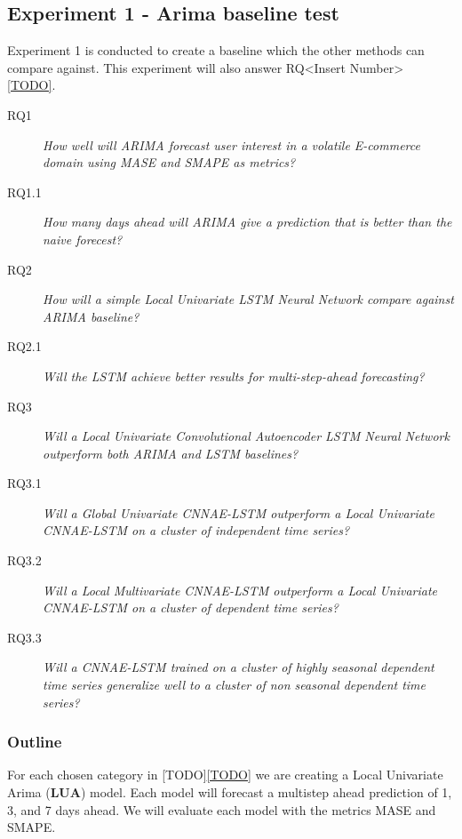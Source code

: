 
\subsection{Experiment 1 - Arima baseline test}
\label{section:Method:Experiment1-Arima}

Experiment 1 is conducted to create a baseline which
the other methods can compare against. This experiment will also
answer RQ<Insert Number> \cref{TODO}.



\begin{description}
  \item[RQ1]{\it How well will ARIMA forecast user interest in a volatile E-commerce domain using MASE and SMAPE as metrics?}
  \item[RQ1.1]{\it How many days ahead will ARIMA give a prediction that is better than the naive forecest?}
\end{description}
\begin{description}
  \item[RQ2]{\it How will a simple Local Univariate LSTM Neural Network compare against ARIMA baseline?}
  \item[RQ2.1]{\it Will the LSTM achieve better results for multi-step-ahead forecasting?}
\end{description}
\begin{description}
  \item[RQ3]{\it Will a Local Univariate Convolutional Autoencoder LSTM Neural Network outperform both ARIMA and LSTM baselines?}
  \item[RQ3.1]{\it Will a Global Univariate CNNAE-LSTM outperform a Local Univariate CNNAE-LSTM on a cluster of independent time series?}
  \item[RQ3.2]{\it Will a Local Multivariate CNNAE-LSTM outperform a Local Univariate CNNAE-LSTM on a cluster of dependent time series?}
  \item[RQ3.3]{\it Will a CNNAE-LSTM trained on a cluster of highly seasonal dependent time series generalize well to a cluster of non seasonal dependent time series?}
\end{description}

\subsubsection{Outline}
For each chosen category in [TODO]\cref{TODO} we are creating a Local Univariate Arima (\textbf{LUA})
model. Each model will forecast a multistep ahead prediction of 1, 3, and 7 days ahead.
We will evaluate each model with the metrics MASE and SMAPE.


